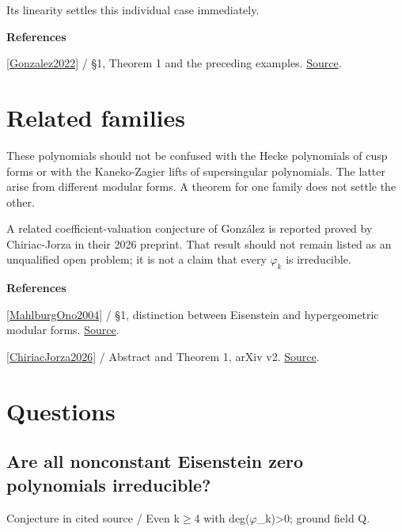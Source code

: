 \documentclass[11pt,a4paper,oneside,openany]{book}
\newcommand{\atlasdisplay}[1]{\par\begingroup\centering\vspace{3pt}\noindent\adjustbox{max width=\linewidth}{\(\displaystyle #1\)}\par\vspace{5pt}\endgroup}
\newenvironment{sources}{\par\smallskip\begingroup\footnotesize\color{atlasgray}\leftskip=10pt\setlength{\parskip}{2pt}}{\par\endgroup\smallskip}
\begin{document}
\atlasdisplay{\varphi_{16}(X)=X-\frac{3456000}{3617}.}
\color{black} Its linearity settles this individual case immediately.\par
\begin{sources}
\textbf{References}\par\smallskip
\noindent\hyperlink{ref:Gonzalez2022}{[Gonzalez2022]} / §1, Theorem 1 and the preceding examples.  \href{https://link.springer.com/article/10.1007/s00013-022-01766-6}{Source}.\par
\end{sources}\color{black}
\section{Related families}
\color{black} These polynomials should not be confused with the Hecke polynomials of cusp forms or with the Kaneko-Zagier lifts of supersingular polynomials. The latter arise from different modular forms. A theorem for one family does not settle the other.\par
\color{black} A related coefficient-valuation conjecture of González is reported proved by Chiriac-Jorza in their 2026 preprint. That result should not remain listed as an unqualified open problem; it is not a claim that every \(\varphi_k\) is irreducible.\par
\begin{sources}
\textbf{References}\par\smallskip
\noindent\hyperlink{ref:MahlburgOno2004}{[MahlburgOno2004]} / §1, distinction between Eisenstein and hypergeometric modular forms.  \href{https://doi.org/10.4064/aa113-1-4}{Source}.\par
\noindent\hyperlink{ref:ChiriacJorza2026}{[ChiriacJorza2026]} / Abstract and Theorem 1, arXiv v2.  \href{https://arxiv.org/abs/2605.09738v2}{Source}.\par
\end{sources}\color{black}
\section*{Questions}
\subsection*{Are all nonconstant Eisenstein zero polynomials irreducible?}
{\small\sffamily\color{atlasgold}Conjecture in cited source / Even k\ensuremath{\ge}4 with deg(\ensuremath{\varphi}\_\allowbreak{}k)>0; ground field Q.}\par\smallskip
\end{document}
